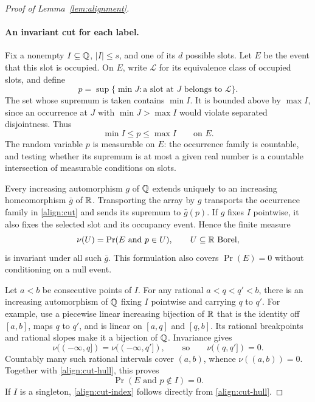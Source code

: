 \begin{proof}[Proof of Lemma~\ref{lem:alignment}]
\paragraph{An invariant cut for each label.}
Fix a nonempty $I\subseteq\mathbb Q$, $|I|\leq s$, and one of its $d$ possible
slots.  Let $E$ be the event that this slot is occupied.  On $E$, write
$\mathcal L$ for its equivalence class of occupied slots, and define
\begin{equation}\label{align:cut}
 p=\sup\{\min J:\text{a slot at }J\text{ belongs to }\mathcal L\}.
\end{equation}
The set whose supremum is taken contains $\min I$.  It is bounded above
by $\max I$, since an occurrence at $J$ with $\min J>\max I$ would
violate separated disjointness.  Thus
\begin{equation}\label{align:cut-hull}
 \min I\leq p\leq\max I
 \qquad\text{on }E.
\end{equation}
The random variable $p$ is measurable on $E$: the occurrence family is
countable, and testing whether its supremum is at most a given real number
is a countable intersection of measurable conditions on slots.

Every increasing automorphism $g$ of $\mathbb Q$ extends uniquely to an increasing
homeomorphism $\bar g$ of $\mathbb R$.  Transporting the array by $g$ transports
the occurrence family in \eqref{align:cut} and sends its supremum to
$\bar g(p)$.  If $g$ fixes $I$ pointwise, it also fixes the selected slot
and its occupancy event.  Hence the finite measure
\[
 \nu(U)=\Pr(E\text{ and }p\in U),
 \qquad U\subseteq\mathbb R\text{ Borel},
\]
is invariant under all such $\bar g$.  This formulation also covers
$\Pr(E)=0$ without conditioning on a null event.

Let $a<b$ be consecutive points of $I$.  For any rational
$a<q<q'<b$, there is an increasing automorphism of $\mathbb Q$ fixing $I$
pointwise and carrying $q$ to $q'$.  For example, use a piecewise linear
increasing bijection of $\mathbb R$ that is the identity off $[a,b]$, maps $q$
to $q'$, and is linear on $[a,q]$ and $[q,b]$.  Its rational breakpoints
and rational slopes make it a bijection of $\mathbb Q$.  Invariance gives
\[
 \nu(({-\infty},q])=\nu(({-\infty},q']),
 \qquad\text{so}\qquad \nu((q,q'])=0.
\]
Countably many such rational intervals cover $(a,b)$, whence
$\nu((a,b))=0$.  Together with \eqref{align:cut-hull}, this proves
\begin{equation}\label{align:cut-index}
 \Pr(E\text{ and }p\notin I)=0.
\end{equation}
If $I$ is a singleton, \eqref{align:cut-index} follows directly from
\eqref{align:cut-hull}.


\end{proof}
